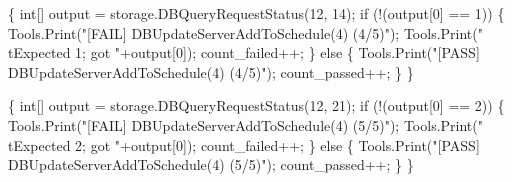 \documentclass{article}
\def\nwendcode{\endtrivlist \endgroup}
\let\nwdocspar=\par
\begin{document}
\{
  int[] output = storage.DBQueryRequestStatus(12, 14);
  if (!(output[0] == 1)) \{
    Tools.Print("[FAIL] DBUpdateServerAddToSchedule(4) (4/5)");
    Tools.Print("\\tExpected 1; got "+output[0]);
    count_failed++;
  \} else \{
    Tools.Print("[PASS] DBUpdateServerAddToSchedule(4) (4/5)");
    count_passed++;
  \}
\}
\nwendcode{}\nwdocspar
\nwenddocs{}\endmoddef{}
\{
  int[] output = storage.DBQueryRequestStatus(12, 21);
  if (!(output[0] == 2)) \{
    Tools.Print("[FAIL] DBUpdateServerAddToSchedule(4) (5/5)");
    Tools.Print("\\tExpected 2; got "+output[0]);
    count_failed++;
  \} else \{
    Tools.Print("[PASS] DBUpdateServerAddToSchedule(4) (5/5)");
    count_passed++;
  \}
\}
\nwendcode{}\nwdocspar
\end{document}

